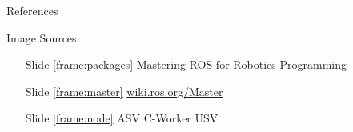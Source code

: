 \documentclass[9pt]{beamer}
\begin{document}
\begin{section}{References}
    \begin{frame}{Image Sources}
        \begin{itemize}
            \item [Slide \ref{frame:packages}] Mastering ROS for Robotics Programming
            \item [Slide \ref{frame:master}] \url{wiki.ros.org/Master}
            \item [Slide \ref{frame:node}] ASV C-Worker USV 
        \end{itemize}
    \end{frame}
\end{section}
\end{document}
